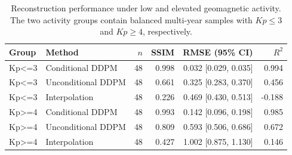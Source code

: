 \begin{table}[htbp]
\centering
\caption{Reconstruction performance under low and elevated geomagnetic activity. The two activity groups contain balanced multi-year samples with $Kp\leq3$ and $Kp\geq4$, respectively.}
\label{tab:kp_robustness}
\begin{tabular}{llrrrr}
\hline
Group & Method & $n$ & SSIM & RMSE (95\% CI) & $R^2$ \\
\hline
Kp<=3 & Conditional DDPM & 48 & 0.998 & 0.032 [0.029, 0.035] & 0.994 \\
Kp<=3 & Unconditional DDPM & 48 & 0.661 & 0.325 [0.283, 0.370] & 0.456 \\
Kp<=3 & Interpolation & 48 & 0.226 & 0.469 [0.430, 0.513] & -0.188 \\
\hline
Kp>=4 & Conditional DDPM & 48 & 0.993 & 0.142 [0.096, 0.198] & 0.985 \\
Kp>=4 & Unconditional DDPM & 48 & 0.809 & 0.593 [0.506, 0.686] & 0.672 \\
Kp>=4 & Interpolation & 48 & 0.427 & 1.002 [0.875, 1.130] & 0.146 \\
\hline
\end{tabular}
\end{table}
